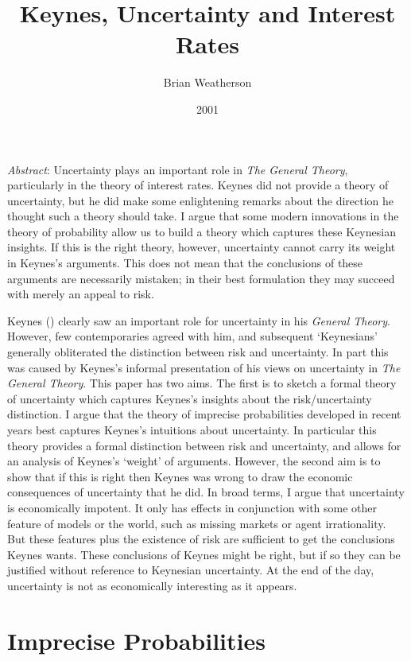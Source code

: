 \documentclass[
  11pt,
  letterpaper,
  DIV=11,
  numbers=noendperiod,
  twoside]{scrartcl}
\title{Keynes, Uncertainty and Interest Rates}
\author{Brian Weatherson}
\date{2001}
\renewenvironment{abstract}
 {\vspace{-1.25cm}
 \quotation\small\noindent\emph{Abstract}:}
 {\endquotation}
\renewenvironment{abstract}
 {\quotation\small\noindent\emph{Abstract}:}
 {\endquotation\vspace{-0.02cm}}
\begin{document}
\maketitle
\begin{abstract}
Uncertainty plays an important role in \emph{The General Theory},
particularly in the theory of interest rates. Keynes did not provide a
theory of uncertainty, but he did make some enlightening remarks about
the direction he thought such a theory should take. I argue that some
modern innovations in the theory of probability allow us to build a
theory which captures these Keynesian insights. If this is the right
theory, however, uncertainty cannot carry its weight in Keynes's
arguments. This does not mean that the conclusions of these arguments
are necessarily mistaken; in their best formulation they may succeed
with merely an appeal to risk.
\end{abstract}


Keynes () clearly saw an important role
for uncertainty in his \emph{General Theory}. However, few
contemporaries agreed with him, and subsequent `Keynesians' generally
obliterated the distinction between risk and uncertainty. In part this
was caused by Keynes's informal presentation of his views on uncertainty
in \emph{The General Theory}. This paper has two aims. The first is to
sketch a formal theory of uncertainty which captures Keynes's insights
about the risk/uncertainty distinction. I argue that the theory of
imprecise probabilities developed in recent years best captures Keynes's
intuitions about uncertainty. In particular this theory provides a
formal distinction between risk and uncertainty, and allows for an
analysis of Keynes's `weight' of arguments. However, the second aim is
to show that if this is right then Keynes was wrong to draw the economic
consequences of uncertainty that he did. In broad terms, I argue that
uncertainty is economically impotent. It only has effects in conjunction
with some other feature of models or the world, such as missing markets
or agent irrationality. But these features plus the existence of risk
are sufficient to get the conclusions Keynes wants. These conclusions of
Keynes might be right, but if so they can be justified without reference
to Keynesian uncertainty. At the end of the day, uncertainty is not as
economically interesting as it appears.

\section{Imprecise Probabilities}\label{imprecise-probabilities}
\end{document}
